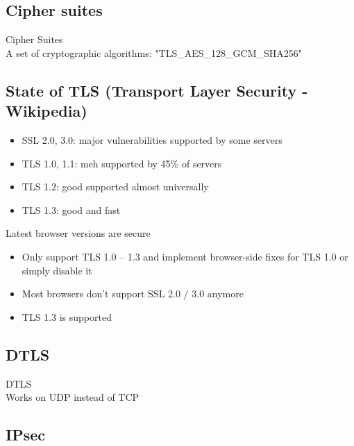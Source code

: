 
\subsection{Cipher suites}

\begin{definition}{Cipher Suites}\\
    A set of cryptographic algorithms: "TLS\_AES\_128\_GCM\_SHA256"
\end{definition}

\subsection{State of TLS (Transport Layer Security - Wikipedia)}

\begin{remark}
    \begin{itemize}
        \item SSL 2.0, 3.0: major vulnerabilities supported by some servers
        \item TLS 1.0, 1.1: meh supported by 45\% of servers
        \item TLS 1.2: good supported almost universally
        \item TLS 1.3: good and fast
    \end{itemize}
    
    Latest browser versions are secure
    \begin{itemize}
        \item Only support TLS 1.0 – 1.3 and implement browser-side fixes for TLS 1.0 or simply disable it
        \item Most browsers don't support SSL 2.0 / 3.0 anymore
        \item TLS 1.3 is supported
    \end{itemize}
\end{remark}

\subsection{DTLS}

\begin{concept}{DTLS}\\
    Works on UDP instead of TCP
\end{concept}

\subsection{IPsec}

